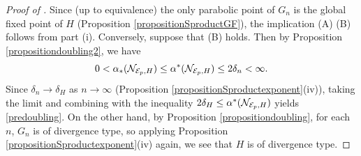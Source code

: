 \begin{proof}[Proof of ]
Since (up to equivalence) the only parabolic point of $G_n$ is the global fixed point of $H$ (Proposition \ref{propositionSproductGF}), the implication (A) \implies (B) follows from part (i). Conversely, suppose that (B) holds. Then by Proposition \ref{propositiondoubling2}, we have
\[
0 < \alpha_*(\mathcal N_{\mathcal E_p,H}) \leq \alpha^*(\mathcal N_{\mathcal E_p,H}) \leq 2\delta_n < \infty.
\]
Since $\delta_n\to \delta_H$ as $n\to\infty$ (Proposition \ref{propositionSproductexponent}(iv)), taking the limit and combining with the inequality $2\delta_H \leq \alpha^*(\mathcal N_{\mathcal E_p,H})$ yields \eqref{predoubling}. On the other hand, by Proposition \ref{propositiondoubling}, for each $n$, $G_n$ is of divergence type, so applying Proposition \ref{propositionSproductexponent}(iv) again, we see that $H$ is of divergence type.
%
\end{proof}

